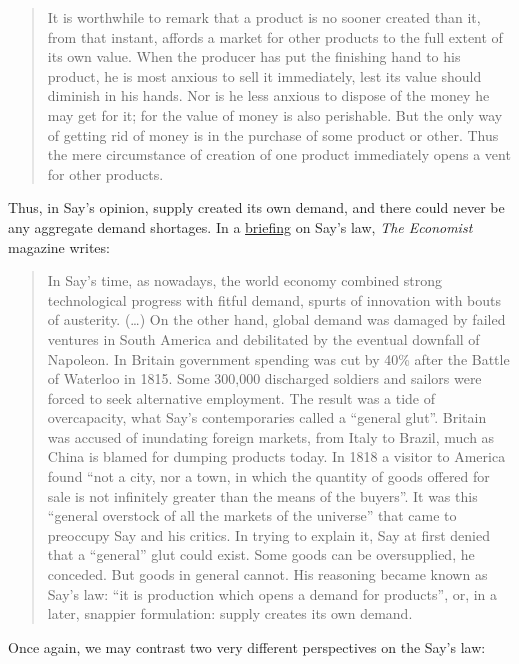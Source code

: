 \documentclass[]{book}
\theoremstyle{definition}
\theoremstyle{definition}
\theoremstyle{definition}
\theoremstyle{remark}
\begin{document}
\begin{quote}
It is worthwhile to remark that a product is no sooner created than it,
from that instant, affords a market for other products to the full
extent of its own value. When the producer has put the finishing hand to
his product, he is most anxious to sell it immediately, lest its value
should diminish in his hands. Nor is he less anxious to dispose of the
money he may get for it; for the value of money is also perishable. But
the only way of getting rid of money is in the purchase of some product
or other. Thus the mere circumstance of creation of one product
immediately opens a vent for other products.
\end{quote}

Thus, in Say's opinion, supply created its own demand, and there could
never be any aggregate demand shortages. In a
\href{https://www.economist.com/economics-brief/2017/08/10/says-law-supply-creates-its-own-demand}{briefing}
on Say's law, \emph{The Economist} magazine writes:

\begin{quote}
In Say's time, as nowadays, the world economy combined strong
technological progress with fitful demand, spurts of innovation with
bouts of austerity. (\ldots{}) On the other hand, global demand was
damaged by failed ventures in South America and debilitated by the
eventual downfall of Napoleon. In Britain government spending was cut by
40\% after the Battle of Waterloo in 1815. Some 300,000 discharged
soldiers and sailors were forced to seek alternative employment. The
result was a tide of overcapacity, what Say's contemporaries called a
``general glut''. Britain was accused of inundating foreign markets,
from Italy to Brazil, much as China is blamed for dumping products
today. In 1818 a visitor to America found ``not a city, nor a town, in
which the quantity of goods offered for sale is not infinitely greater
than the means of the buyers''. It was this ``general overstock of all
the markets of the universe'' that came to preoccupy Say and his
critics. In trying to explain it, Say at first denied that a ``general''
glut could exist. Some goods can be oversupplied, he conceded. But goods
in general cannot. His reasoning became known as Say's law: ``it is
production which opens a demand for products'', or, in a later, snappier
formulation: supply creates its own demand.
\end{quote}

Once again, we may contrast two very different perspectives on the Say's
law:
\end{document}
